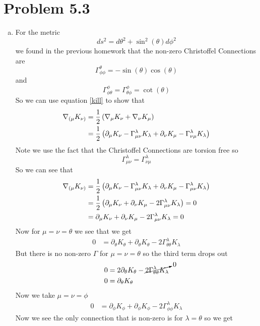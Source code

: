\documentclass[11pt]{article}
\numberwithin{equation}{section}
\newcommand{\HWnum}{5}
\begin{document}
\section{Problem \HWnum.3}
\begin{enumerate}[(a)]
\item
For the metric
$$ds^2 = d\theta^2+\sin^2(\theta)d\phi^2$$
we found in the previous homework that the non-zero Christoffel Connections are
$$\Gamma^{\theta}_{\phi\phi} = -\sin(\theta)\cos(\theta)$$
and
$$\Gamma^{\phi}_{\phi\theta} = \Gamma^{\phi}_{\theta\phi} = \cot(\theta)$$
So we can use equation \ref{kill} to show that
\begin{align*}
\bold\nabla_{(\mu}K_{\nu)} &= \frac{1}{2}\left(\bold\nabla_{\mu}K_{\nu}+\bold\nabla_{\nu}K_{\mu}\right)\\
&= \frac{1}{2}\left(\partial_{\mu}K_{\nu} - \Gamma^{\lambda}_{\mu\nu}K_{\lambda}+\partial_{\nu}K_{\mu} - \Gamma^{\lambda}_{\nu\mu}K_{\lambda}\right)
\end{align*}
Note we use the fact that the Christoffel Connections are torsion free so 
$$\Gamma^{\lambda}_{\mu\nu} = \Gamma^{\lambda}_{\nu\mu}$$
So we can see that
\begin{align*}
\bold\nabla_{(\mu}K_{\nu)} &= \frac{1}{2}\left(\partial_{\mu}K_{\nu} - \Gamma^{\lambda}_{\mu\nu}K_{\lambda}+\partial_{\nu}K_{\mu} - \Gamma^{\lambda}_{\mu\nu}K_{\lambda}\right)\\
&= \frac{1}{2}\left(\partial_{\mu}K_{\nu} + \partial_{\nu}K_{\mu} - 2\Gamma^{\lambda}_{\mu\nu}K_{\lambda}\right) = 0\\
&= \partial_{\mu}K_{\nu} + \partial_{\nu}K_{\mu} - 2\Gamma^{\lambda}_{\mu\nu}K_{\lambda} = 0
\end{align*}
Now for $\mu=\nu=\theta$ we see that we get
\begin{align*}
0 &= \partial_{\theta}K_{\theta} + \partial_{\theta}K_{\theta} - 2\Gamma^{\lambda}_{\theta\theta}K_{\lambda} 
\end{align*}
But there is no non-zero $\Gamma$ for $\mu=\nu=\theta$ so the third term drops out 
\begin{align*}
0 &= 2\partial_{\theta}K_{\theta} - \cancelto{0}{2\Gamma^{\lambda}_{\theta\theta}K_{\lambda}} \\
0 &= \partial_{\theta}K_{\theta} 
\end{align*}
Now we take $\mu=\nu=\phi$
\begin{align*}
0 &= \partial_{\phi}K_{\phi} + \partial_{\phi}K_{\phi} - 2\Gamma^{\lambda}_{\phi\phi}K_{\lambda}
\end{align*}
Now we see the only connection that is non-zero is for $\lambda = \theta$ so we get

\end{enumerate}
\end{document}
